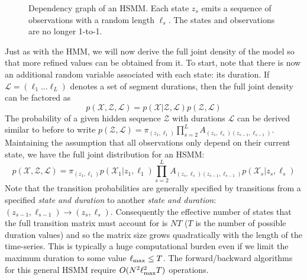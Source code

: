 \documentclass[onecolumn]{gwclass}
\begin{document}
		\begin{figure}[b!]
		\centering
		\caption{Dependency graph of an HSMM. Each state $z_s$ emits a sequence of observations with a random length $\ell_s$. The states and observations are no longer 1-to-1.}
	\end{figure}
	
	Just as with the HMM, we will now derive the full joint density of the model so that more refined values can be obtained from it. To start, note that there is now an additional random variable associated with each state: its duration. If $\mathcal{L}=(\ell_1 \dots \ell_L)$ denotes a set of segment durations, then the full joint density can be factored as
	$$ p(\mathcal{X}, \mathcal{Z}, \mathcal{L}) =p(\mathcal{X}|\mathcal{Z},\mathcal{L})p(\mathcal{Z},\mathcal{L})$$
	The probability of a given hidden sequence $\mathcal{Z}$ with durations $\mathcal{L}$ can be derived similar to before to write
	$ p(\mathcal{Z},\mathcal{L}) = \pi_{(z_1,\ell_1)} \prod_{s=2}^L A_{(z_s,\ell_s)(z_{s-1},\ell_{s-1})} $. Maintaining the assumption that all observations only depend on their current state, we have the full joint distribution for an HSMM:
	$$ p(\mathcal{X},\mathcal{Z},\mathcal{L}) = \pi_{(z_1,\ell_1)}p(\mathcal{X}_1|z_1,\ell_1)\prod_{s=2}^L A_{(z_s,\ell_s)(z_{s-1},\ell_{s-1})}p(\mathcal{X}_s|z_s,\ell_s)  $$
	Note that the transition probabilities are generally specified by transitions from a specified \emph{state and duration} to another \emph{state and duration}: $(z_{s-1},\ell_{s-1})\to(z_s,\ell_s)$. Consequently the effective number of states that the full transition matrix must account for is $NT$ ($T$ is the number of possible duration values) and so the matrix size grows quadratically with the length of the time-series. This is typically a huge computational burden even if we limit the maximum duration to some value $\ell_{\text{\normalfont{max}}}\leq T$. The forward/backward algorithms for this general HSMM require $O(N^2\ell_{\text{\normalfont{max}}}^2T)$ operations.
	
\end{document}
